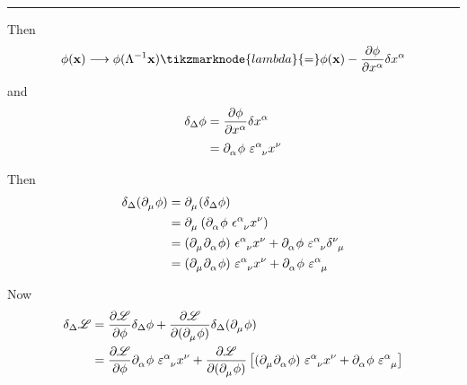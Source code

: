 \documentclass{article}
\begin{document}
\noindent\rule{\textwidth}{.5pt}


\noindent Then
\begin{equation*}
    \phi (\mathbf{x}) \longrightarrow \phi ( \Lambda^{-1} \mathbf{x} ) \tikzmarknode{lambda}{=} \phi (\mathbf{x}) - \dfrac{ \partial \phi }{ \partial \tensor{x}{^\alpha} } \delta \tensor{x}{^\alpha}
\end{equation*}
and
\begin{align*}
    \delta_\Delta \phi &= \dfrac{ \partial \phi }{ \partial \tensor{x}{^\alpha} } \delta \tensor{x}{^\alpha} \\
    &= \tensor{\partial}{_\alpha} \phi ~ \tensor{\varepsilon}{^\alpha _\nu} \tensor{x}{^\nu}
\end{align*}

\noindent Then
\begin{align*}
    \delta_\Delta ( \tensor{\partial}{_\mu} \phi ) &= \tensor{\partial}{_\mu} ( \delta_\Delta \phi ) \\
    &= \tensor{\partial}{_\mu} \left( \tensor{\partial}{_\alpha} \phi ~ \tensor{\epsilon}{^\alpha _\nu} \tensor{x}{^\nu} \right) \\
    &= ( \tensor{\partial}{_\mu} \tensor{\partial}{_\alpha} \phi ) ~ \tensor{\epsilon}{^\alpha _\nu} \tensor{x}{^\nu} + \tensor{\partial}{_\alpha} \phi ~ \tensor{\varepsilon}{^\alpha _\nu} \tensor{\delta}{^\nu _\mu} \\
    &= ( \tensor{\partial}{_\mu} \tensor{\partial}{_\alpha} \phi ) ~ \tensor{\varepsilon}{^\alpha _\nu} \tensor{x}{^\nu} + \tensor{\partial}{_\alpha} \phi ~ \tensor{\varepsilon}{^\alpha _\mu}
\end{align*}

\noindent Now
\begin{align*}
    \delta_\Delta \mathscr{L} &= \dfrac{ \partial \mathscr{L} }{ \partial \phi } \delta_\Delta \phi + \dfrac{ \partial \mathscr{L} }{ \partial ( \tensor{\partial}{_\mu} \phi ) } \delta_\Delta ( \tensor{\partial}{_\mu} \phi ) \\
    &= \dfrac{ \partial \mathscr{L} }{ \partial \phi } \tensor{\partial}{_\alpha} \phi ~ \tensor{\varepsilon}{^\alpha _\nu} \tensor{x}{^\nu} + \dfrac{ \partial \mathscr{L} }{ \partial ( \tensor{\partial}{_\mu} \phi ) } \left[ ( \tensor{\partial}{_\mu} \tensor{\partial}{_\alpha} \phi ) ~ \tensor{\varepsilon}{^\alpha _\nu} \tensor{x}{^\nu} + \tensor{\partial}{_\alpha} \phi ~ \tensor{\varepsilon}{^\alpha _\mu} \right]
\end{align*}
\end{document}

